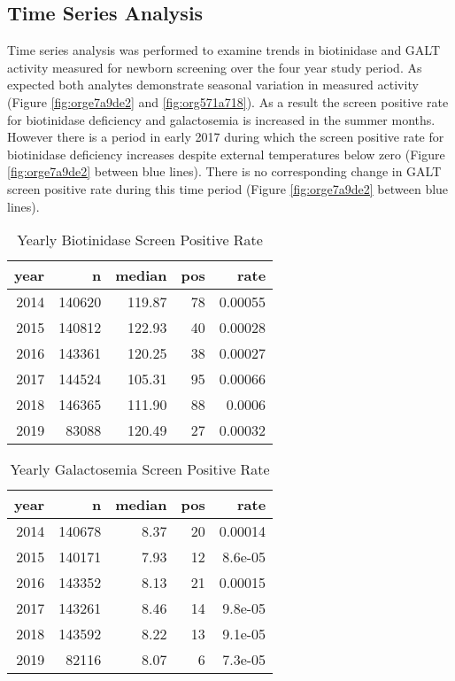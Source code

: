 \documentclass[review]{elsarticle}
\begin{document}
\subsection*{Time Series Analysis}
\label{sec:org25be887}
Time series analysis was performed to examine trends in biotinidase
and GALT activity measured for newborn screening over the four year
study period. As expected both analytes demonstrate seasonal variation
in measured activity (Figure \ref{fig:orge7a9de2} and \ref{fig:org571a718}). As a result
the screen positive rate for biotinidase deficiency and galactosemia
is increased in the summer months. However there is a period in early
2017 during which the screen positive rate for biotinidase deficiency
increases despite external temperatures below zero (Figure \ref{fig:orge7a9de2}
between blue lines). There is no corresponding change in GALT screen
positive rate during this time period (Figure \ref{fig:orge7a9de2}
between blue lines). 

\begin{table}[ht]
\centering
\begin{tabular}{rrrrr}
  \hline
year & n & median & pos & rate \\ 
  \hline
2014 & 140620 & 119.87 &  78 & 0.00055 \\ 
  2015 & 140812 & 122.93 &  40 & 0.00028 \\ 
  2016 & 143361 & 120.25 &  38 & 0.00027 \\ 
  2017 & 144524 & 105.31 &  95 & 0.00066 \\ 
  2018 & 146365 & 111.90 &  88 & 0.0006 \\ 
  2019 & 83088 & 120.49 &  27 & 0.00032 \\ 
   \hline
\end{tabular}
\caption{Yearly Biotinidase Screen Positive Rate} 
\label{tab:biot_year}
\end{table}

\begin{table}[ht]
\centering
\begin{tabular}{rrrrr}
  \hline
year & n & median & pos & rate \\ 
  \hline
2014 & 140678 & 8.37 &  20 & 0.00014 \\ 
  2015 & 140171 & 7.93 &  12 & 8.6e-05 \\ 
  2016 & 143352 & 8.13 &  21 & 0.00015 \\ 
  2017 & 143261 & 8.46 &  14 & 9.8e-05 \\ 
  2018 & 143592 & 8.22 &  13 & 9.1e-05 \\ 
  2019 & 82116 & 8.07 &   6 & 7.3e-05 \\ 
   \hline
\end{tabular}
\caption{Yearly Galactosemia Screen Positive Rate} 
\label{tab:galt_year}
\end{table}
\end{document}
